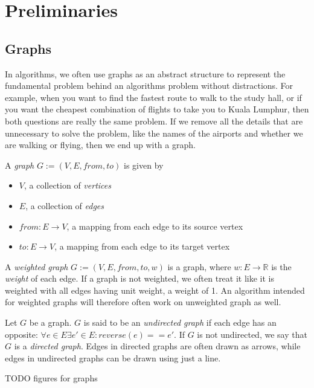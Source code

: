\chapter{Preliminaries}

\section{Graphs}
In algorithms, we often use graphs as an abstract structure to represent the fundamental problem behind an algorithms problem without distractions. For example, when you want to find the fastest route to walk to the study hall, or if you want the cheapest combination of flights to take you to Kuala Lumphur, then both questions are really the same problem. If we remove all the details that are unnecessary to solve the problem, like the names of the airports and whether we are walking or flying, then we end up with a graph.

\begin{definition}[Graph]
    A \emph{graph} $G := (V, E, from, to)$ is given by
\begin{itemize}
    \item $V$, a collection of \emph{vertices}
    \item $E$, a collection of \emph{edges}
    \item $from : E \rightarrow V$, a mapping from each edge to its source vertex
    \item $to : E \rightarrow V$, a mapping from each edge to its target vertex 
\end{itemize}
\end{definition}

\begin{definition}
    A \emph{weighted graph} $G := (V, E, from, to, w)$ is a graph, where $w : E \rightarrow \mathbb{R}$ is the \emph{weight} of each edge. If a graph is not weighted, we often treat it like it is weighted with all edges having unit weight, a weight of 1. An algorithm intended for weighted graphs will therefore often work on unweighted graph as well.
\end{definition}

\begin{definition}
    Let $G$ be a graph. $G$ is said to be an \emph{undirected graph} if each edge has an opposite: $\forall e \in E \exists e' \in E : reverse(e) == e'$.
    If $G$ is not undirected, we say that $G$ is a \emph{directed graph}.
    Edges in directed graphs are often drawn as arrows, while edges in undirected graphs can be drawn using just a line.

    TODO figures for graphs
\end{definition}

